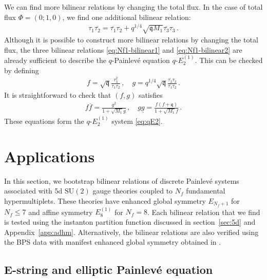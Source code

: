 \documentclass[11pt, a4paper]{article}
\theoremstyle{definition}
\begin{document}
We can find more bilinear relations by changing the total flux. In the case of total flux $ \Phi=(0;1,0) $, we find one additional bilinear relation:
\begin{align}\label{eq:Nf1-bilinear2}
    \tau_1 \overline{\tau_2} = \overline{\tau_1} \tau_2 + q^{1/4} \sqrt{\mathfrak{q}M_1} \overline{\tau_3} \tau_3 \, .
\end{align}
Although it is possible to construct more bilinear relations by changing the total flux, the three bilinear relations \eqref{eq:Nf1-bilinear1} and \eqref{eq:Nf1-bilinear2} are already sufficient to describe the $ q $-Painlev\'e equation $ q\text{-}E_2^{(1)} $. This can be checked by defining
\begin{align}
    f = \sqrt{\mathfrak{q}} \frac{\tau_3^2}{\tau_1 \tau_2} \, , \quad
    g = q^{1/4} \sqrt{\mathfrak{q}} \frac{\overline{\tau_3} \tau_3}{\overline{\tau_1} \tau_2} \, .
\end{align}
It is straightforward to check that $ (f,g) $ satisfies
\begin{align}
    f\overline{f} = \frac{g^2}{1+\sqrt{M_1} g} \, , \quad
    g\underline{g} = \frac{f(f+\mathfrak{q})}{1+\sqrt{M_1}f} \, .
\end{align}
These equations form the $ q\text{-}E_2^{(1)} $ system \eqref{eq:qE2}.




\section{Applications}\label{sec:applications}

In this section, we bootstrap bilinear relations of discrete Painlev\'e systems associated with 5d $ \mathrm{SU}(2) $ gauge theories coupled to $ N_f $ fundamental hypermultiplets. These theories have enhanced global symmetry $E_{N_f+1}$ for $N_f\le 7$ and affine symmetry $E_8^{(1)}$ for $N_f=8$. Each bilinear relation that we find is tested using the instanton partition function discussed in section~\ref{sec:5d} and Appendix~\ref{app:adhm}. Alternatively, the bilinear relations are also verified using the BPS data with manifest enhanced global symmetry obtained in \cite{Huang:2013yta}.


\subsection{E-string and elliptic Painlev\'e equation}\label{sec:elliptic}
\end{document}
